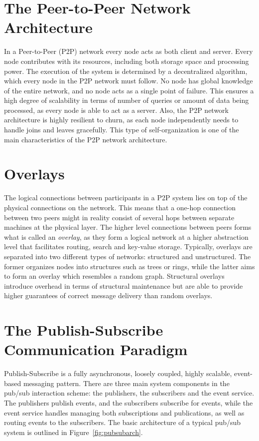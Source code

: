 \section{The Peer-to-Peer Network Architecture}
In a Peer-to-Peer (P2P) network every node acts as both client and
server. Every node contributes with its resources, including both
storage space and processing power. The execution of the system is
determined by a decentralized algorithm, which every node in the P2P
network must follow. No node has global knowledge of the entire network,
and no node acts as a single point of failure. This ensures a high
degree of scalability in terms of number of queries or amount of data
being processed, as every node is able to act as a server. Also, the P2P
network architecture is highly resilient to churn, as each node
independently needs to handle joins and leaves gracefully. This type of
self-organization is one of the main characteristics of the P2P network
architecture.

\section{Overlays}
The logical connections between participants in a P2P
system lies on top of the physical connections on the network. This
means that a one-hop connection between two peers might in reality
consist of several hops between separate machines at the physical layer.
The higher level connections between peers forms what is called an
\emph{overlay}, as they form a logical network at a higher abstraction
level that facilitates routing, search and key-value storage. Typically,
overlays are separated into two different types of networks: structured
and unstructured. The former organizes nodes into structures such as
trees or rings, while the latter aims to form an overlay which resembles
a random graph. Structural overlays introduce overhead in terms of
structural maintenance but are able to provide higher guarantees of
correct message delivery than random overlays.

\section{The Publish-Subscribe Communication Paradigm}
Publish-Subscribe is a fully asynchronous, loosely coupled,
highly scalable, event-based messaging pattern. There are three main
system components in the pub/sub interaction scheme: the publishers, the
subscribers and the event service. The publishers publish events, and
the subscribers subscribe for events, while the event service handles
managing both subscriptions and publications, as well as routing events
to the subscribers. The basic architecture of a typical pub/sub system
is outlined in Figure~\ref{fig:pubsubarch}.

